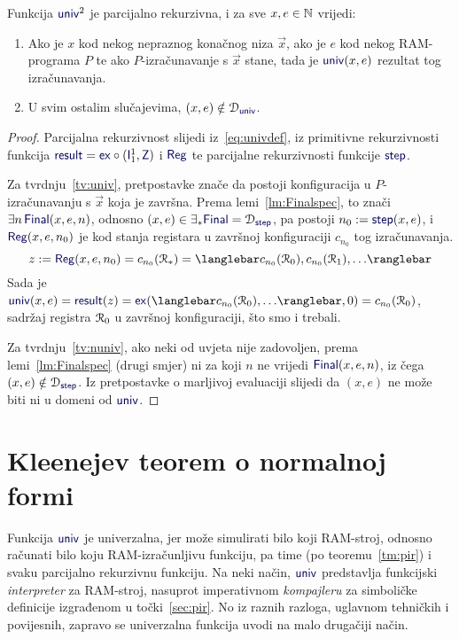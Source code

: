 \begin{lema}[{name=[parcijalna rekurzivnost univerzalne funkcije]}]\label{lm:univspec}
Funkcija $\f{univ}^2$ je parcijalno rekurzivna, i za sve $x,e\in{\mathbb N}$ vrijedi:
\begin{enumerate}
    \item\label{tv:univ} Ako je $x$ kod nekog nepraznog konačnog niza $\vec x$, ako je $e$ kod nekog RAM-programa $P$ te ako $P$-izračunavanje s $\vec x$ stane, tada je $\f{univ}(x,e)$ rezultat tog izračunavanja.
    \item\label{tv:nuniv} U svim ostalim slučajevima, $(x,e)\notin\dom{\f{univ}}$.
\end{enumerate}
\end{lema}
\begin{proof}
Parcijalna rekurzivnost slijedi iz~\eqref{eq:univdef}, iz primitivne rekurzivnosti funkcija $\f{result}=\f{ex}\circ(\f I_1^1,\f Z)$ i $\f{Reg}$ te parcijalne rekurzivnosti funkcije $\f{step}$.

Za tvrdnju~\ref{tv:univ}, pretpostavke znače da postoji konfiguracija u $P$-izračunavanju s $\vec x$ koja je završna. Prema lemi~\ref{lm:Finalspec}, to znači $\exists n\,\f{Final}(x,e,n)$, odnosno $(x,e)\in\exists_*\f{Final}=\dom{\f{step}}$, pa postoji $n_0:=\f{step}(x,e)$, i $\f{Reg}(x,e,n_0)$ je kod stanja registara u završnoj konfiguraciji $c_{n_0}$ tog izračunavanja.
\begin{equation}
    z:=\f{Reg}(x,e,n_0)=c_{n_0}(\reg{*})=\knk{c_{n_0}(\reg0),c_{n_0}(\reg1),\dotsc}
\end{equation}
Sada je $\f{univ}(x,e)=\f{result}(z)=\f{ex}(\knk{c_{n_0}(\reg0),\dotsc},0)=c_{n_0}(\reg0)$, sadržaj registra $\mathcal R_{0}$ u završnoj konfiguraciji, što smo i trebali.

Za tvrdnju~\ref{tv:nuniv}, ako neki od  uvjeta nije zadovoljen, prema lemi~\ref{lm:Finalspec} (drugi smjer) ni za koji $n$ ne vrijedi $\f{Final}(x,e,n)$, iz čega $(x,e)\notin\dom{\f{step}}$. Iz pretpostavke o marljivoj evaluaciji slijedi da $(x,e)$ ne može biti ni u domeni od $\f{univ}$.
\end{proof}

\section{Kleenejev teorem o normalnoj formi}

Funkcija $\f{univ}$ je univerzalna, jer može simulirati bilo koji RAM-stroj, odnosno ra\-ču\-na\-ti bilo koju RAM-izračunljivu funkciju, pa time (po teoremu~\ref{tm:pir}) i svaku parcijalno rekurzivnu funkciju. Na neki način, $\f{univ}$ predstavlja funkcijski \emph{interpreter} za RAM-stroj, nasuprot imperativnom \emph{kompajleru} za simboličke definicije izgrađenom u točki~\ref{sec:pir}. No iz raznih razloga, uglavnom tehničkih i povijesnih, zapravo se univerzalna funkcija uvodi na malo drugačiji način.

